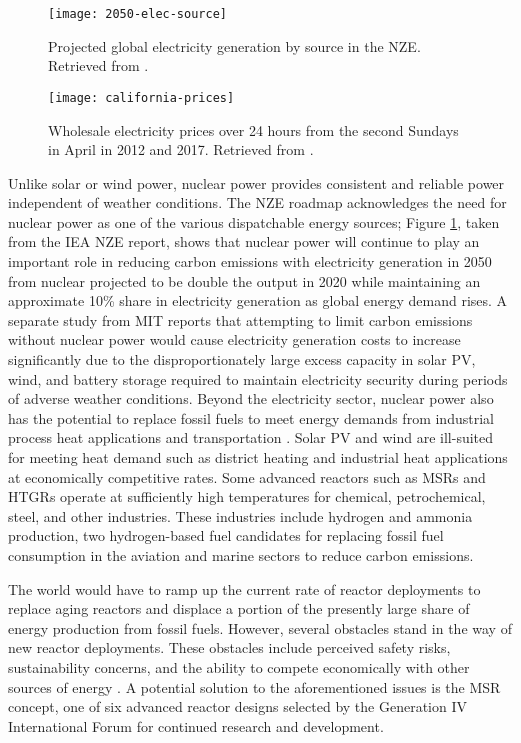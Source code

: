 \begin{figure}[htb!]
	\centering
	\texttt{[image: 2050-elec-source]}
	\caption{Projected global electricity generation by source in the
	\gls{NZE}. Retrieved from \cite{iea_net_2021}.}
	\label{fig:2050-elec-source}
\end{figure}

\begin{figure}[htb!]
	\centering
	\texttt{[image: california-prices]}
	\caption{Wholesale electricity prices over 24 hours from the second Sundays
	in April in 2012 and 2017. Retrieved from \cite{forsberg_market_2020}.}
	\label{fig:cali-prices}
\end{figure}

Unlike solar or wind power, nuclear power provides consistent and reliable
power independent of weather conditions. The \gls{NZE} roadmap acknowledges the
need for nuclear power as one of the various dispatchable energy sources;
Figure \ref{fig:2050-elec-source}, taken from the \gls{IEA} \gls{NZE} report,
shows that nuclear power will continue to play an important role in reducing
carbon emissions with electricity generation in 2050 from nuclear projected to
be double the output in 2020 while maintaining an approximate 10\% share in
electricity generation as global energy demand rises. A separate study from
\gls{MIT} \cite{petti_future_2018} reports that attempting to limit carbon
emissions without nuclear power would cause electricity generation costs to
increase significantly due to the disproportionately large excess capacity in
solar \gls{PV}, wind, and battery storage required to maintain electricity
security during periods of adverse weather conditions.
Beyond the electricity sector, nuclear power also has the potential to replace
fossil fuels to meet energy demands from industrial process heat applications
and transportation \cite{forsberg_market_2020}. Solar \gls{PV} and
wind are ill-suited for meeting heat demand such as district heating and
industrial heat applications at economically competitive rates. Some advanced
reactors such as \glspl{MSR} and \glspl{HTGR} operate at sufficiently
high temperatures for chemical, petrochemical, steel, and other industries.
These industries include hydrogen and ammonia production, two hydrogen-based
fuel candidates for replacing fossil fuel consumption in the aviation and
marine sectors to reduce carbon emissions.

The world would have to ramp up the current rate of reactor deployments to
replace aging reactors and displace a portion of the presently large share of
energy production from fossil fuels. However, several obstacles stand in the
way of new reactor deployments. These obstacles include perceived
safety risks, sustainability concerns,
and the ability to compete economically with other sources of energy
\cite{massachusetts_institute_of_technology_future_2003}. A potential solution
to the aforementioned issues is the \gls{MSR} concept, one of six advanced
reactor designs selected by the Generation IV International Forum
\cite{gif_technology_2002} for continued research and development.

